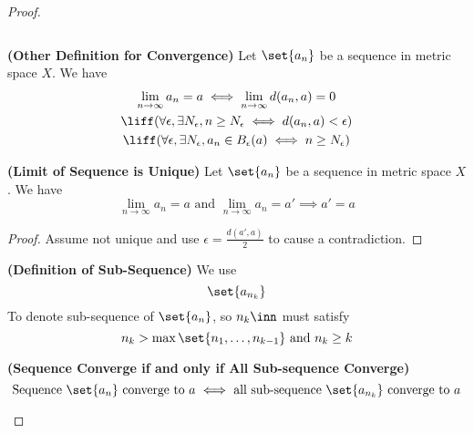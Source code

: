 \documentclass{report}
\begin{document}
\begin{proof}
\begin{definition}
\begin{equation}
\end{equation}
\end{definition}
\begin{theorem}
\label{3.1.5}
\textbf{(Other Definition for Convergence)} Let $\set{a_n}$ be a sequence in metric space $X$. We have
 \begin{gather}
\lim_{n\to \infty}a_n=a\iff \lim_{n\to\infty}d(a_n,a)=0\\
\liff (\forall \epsilon ,\exists N_\epsilon, n\geq N_\epsilon \iff  d(a_n,a)<\epsilon) \\
\liff (\forall \epsilon, \exists N_\epsilon , a_n\in B_\epsilon (a)\iff  n\geq N_\epsilon )
\end{gather}
\end{theorem}
\begin{theorem}
\label{3.1.6}
\textbf{(Limit of Sequence is Unique)} Let $\set{a_n}$ be a sequence in metric space $X$. We have
 \begin{equation}
\lim_{n\to\infty}a_n=a\text{ and }\lim_{n\to\infty}a_n=a'\implies a'=a
\end{equation}
\end{theorem}
\begin{proof}
Assume not unique and use $\epsilon=\frac{d(a',a)}{2}$ to cause a contradiction.
\end{proof}
\begin{definition}
\label{3.1.7}
\textbf{(Definition of Sub-Sequence)} We use
\begin{equation}
\set{a_{n_k}}
\end{equation}
To denote sub-sequence of $\set{a_n}$, so $n_k\inn$ must satisfy
 \begin{equation}
n_k> \max \set{n_1,\dots, n_{k-1}}\text{ and }n_k\geq k 
\end{equation}
\end{definition}
\begin{theorem}
\label{3.1.8}
\textbf{(Sequence Converge if and only if All Sub-sequence Converge)} 
\begin{equation}
\text{ Sequence $\set{a_n}$ converge to $a$ $\iff $ all sub-sequence $\set{a_{n_k}}$ converge to $a$ }
\end{equation}
\end{theorem}

\end{proof}
\end{document}
